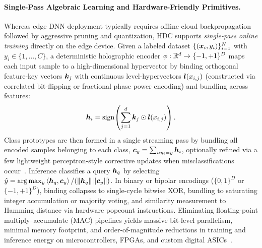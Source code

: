 \paragraph{Single-Pass Algebraic Learning and Hardware-Friendly Primitives.}
Whereas edge DNN deployment typically requires offline cloud backpropagation followed by aggressive pruning and quantization, HDC supports \emph{single-pass online training} directly on the edge device.
Given a labeled dataset $\{(\boldsymbol{x}_i, y_i)\}_{i=1}^{N}$ with $y_i \in \{1, \dots, C\}$, a deterministic holographic encoder $\phi: \mathbb{R}^{d} \to \{-1,+1\}^D$ maps each input sample to a high-dimensional hypervector by binding orthogonal feature-key vectors $\boldsymbol{k}_j$ with continuous level-hypervectors $\boldsymbol{l}(x_{i,j})$ (constructed via correlated bit-flipping or fractional phase power encoding) and bundling across features:
\begin{equation}\label{eq:hdc_encoder}
    \boldsymbol{h}_i = \operatorname{sign}\!\left(\sum_{j=1}^{d} \boldsymbol{k}_j \odot \boldsymbol{l}(x_{i,j})\right).
\end{equation}
Class prototypes are then formed in a single streaming pass by bundling all encoded samples belonging to each class, $\boldsymbol{c}_y = \sum_{i : y_i = y} \boldsymbol{h}_i$, optionally refined via a few lightweight perceptron-style corrective updates when misclassifications occur~\cite{GE_2020_HDC_CLASSIFICATION}.
Inference classifies a query $\boldsymbol{h}_q$ by selecting $\hat{y} = \arg\max_y \left\langle \boldsymbol{h}_q, \boldsymbol{c}_y \right\rangle / (\left\lVert \boldsymbol{h}_q \right\rVert\left\lVert \boldsymbol{c}_y \right\rVert)$.
In binary or bipolar encodings ($\{0,1\}^D$ or $\{-1,+1\}^D$), binding collapses to single-cycle bitwise XOR, bundling to saturating integer accumulation or majority voting, and similarity measurement to Hamming distance via hardware popcount instructions.
Eliminating floating-point multiply--accumulate (MAC) pipelines yields massive bit-level parallelism, minimal memory footprint, and order-of-magnitude reductions in training and inference energy on microcontrollers, FPGAs, and custom digital ASICs~\cite{RAHIMI_HDC_EDGE}.

